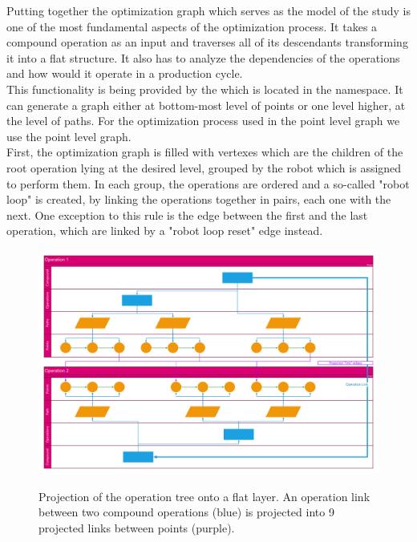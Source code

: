 Putting together the optimization graph which serves as the model of the study is one of the most fundamental aspects of the optimization process. It takes a compound operation as an input and traverses all of its descendants transforming it into a flat structure. It also has to analyze the dependencies of the operations and how would it operate in a production cycle. \\

This functionality is being provided by the  which is located in the  namespace. It can generate a graph either at bottom-most level of points or one level higher, at the level of paths. For the optimization process used in the point level graph we use the point level graph.\\

First, the optimization graph is filled with vertexes which are the children of the root operation lying at the desired level, grouped by the robot which is assigned to perform them. In each group, the operations are ordered and a so-called "robot loop" is created, by linking the operations together in pairs, each one with the next. One exception to this rule is the edge between the first and the last operation, which are linked by a "robot loop reset" edge instead. \\

\begin{figure}
    \centering
	\caption{Projection of the operation tree onto a flat layer. An operation link between two compound operations (blue) is projected into 9 projected links between points (purple).}
	\includegraphics[width=1\textwidth]{graphprojection.pdf}
	\label{fig:GraphProjection}
\end{figure}

